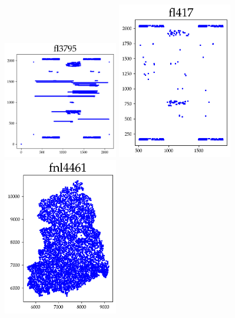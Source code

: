 \begin{appendices}
\begin{figure}[H]
\includegraphics[width=5cm]{../tsplib_euc2d_pictures_of_instances/fl3795.png}
\includegraphics[width=5cm]{../tsplib_euc2d_pictures_of_instances/fl417.png}
\includegraphics[width=5cm]{../tsplib_euc2d_pictures_of_instances/fnl4461.png}

\end{figure}


\end{appendices}
